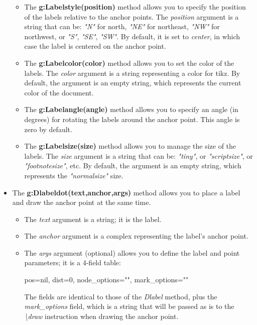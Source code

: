 \begin{itemize}
\begin{itemize}
    \item The \textbf{g:Labelstyle(position)} method allows you to specify the position of the labels relative to the anchor points. The \emph{position} argument is a string that can be: \emph{"N"} for north, \emph{"NE"} for northeast, \emph{"NW"} for northwest, or \emph{"S"}, \emph{"SE"}, \emph{"SW"}. By default, it
is set to \emph{center}, in which case the label is centered on the anchor point.
    \item The \textbf{g:Labelcolor(color)} method allows you to set the color of the labels. The \emph{color} argument is a string representing a color for tikz. By default, the argument is an empty string, which represents the current color of the document.
    \item The \textbf{g:Labelangle(angle)} method allows you to specify an angle (in degrees) for rotating the labels around the anchor point. This angle is zero by default.
    \item The \textbf{g:Labelsize(size)} method allows you to manage the size of the labels. The \emph{size} argument is a string that can be: \emph{"tiny"}, or \emph{"scriptsize"}, or \emph{"footnotesize"}, etc. By default, the argument is an empty string, which represents the \emph{"normalsize"} size.
\end{itemize}

    \item The \textbf{g:Dlabeldot(text,anchor,args)} method allows you to place a label and draw the anchor point at the same time.

\begin{itemize}
    \item The \emph{text} argument is a string; it is the label.
    \item The \emph{anchor} argument is a complex representing the label's anchor point.
    \item The \emph{args} argument (optional) allows you to define the label and point parameters; it is a 4-field table:

\begin{TeXcode}
{ pos=nil, dist=0, node_options="", mark_options="" }
\end{TeXcode}

The fields are identical to those of the \emph{Dlabel} method, plus the \emph{mark\_options} field, which is a string that will be passed as is to the \emph{\textbackslash draw} instruction when drawing the anchor point.
\end{itemize}
\end{itemize}

